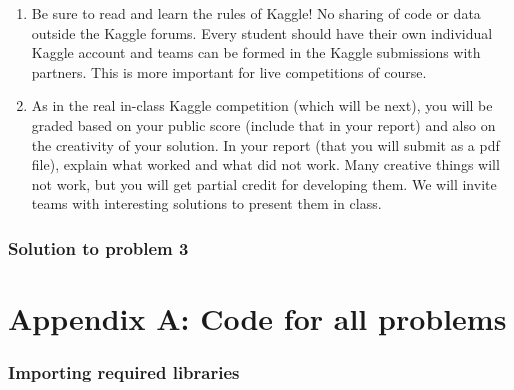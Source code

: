 \documentclass[12pt]{article}%
\begin{document}
\begin{enumerate}
    \item Be sure to read and learn the rules of Kaggle! No sharing of code or data outside the Kaggle forums. Every student should have their own individual Kaggle account and teams can be formed in the Kaggle submissions with partners. This is more important for live competitions of course.
    \item As in the real in-class Kaggle competition (which will be next), you will be graded based on your public score (include that in your report) and also on the creativity of your solution. In your report (that you will submit as a pdf file), explain what worked and what did not work. Many creative things will not work, but you will get partial credit for developing them. We will invite teams with interesting solutions to present them in class.\\
\end{enumerate}

\subsubsection{Solution to problem 3}










\section*{Appendix A: Code for all problems}
\label{appendix:code}

\subsubsection*{Importing required libraries}
\begin{lstlisting}

\end{lstlisting}
\end{document}
